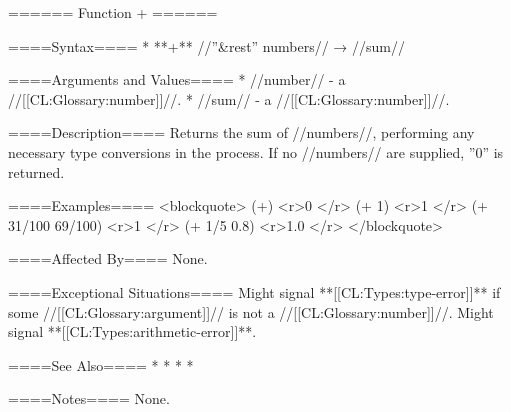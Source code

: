 ====== Function + ======

====Syntax====
  * **+** //''&rest'' numbers// → //sum//

====Arguments and Values====
  * //number// - a //[[CL:Glossary:number]]//.
  * //sum// - a //[[CL:Glossary:number]]//.

====Description====
Returns the sum of //numbers//, performing any necessary type conversions in the process. If no //numbers// are supplied, ''0'' is returned.

====Examples==== 
<blockquote> 
(+) <r>0 </r>
(+ 1) <r>1 </r>
(+ 31/100 69/100) <r>1 </r>
(+ 1/5 0.8) <r>1.0 </r>
</blockquote>

====Affected By====
None.

====Exceptional Situations====
Might signal **[[CL:Types:type-error]]** if some //[[CL:Glossary:argument]]// is not a //[[CL:Glossary:number]]//. Might signal **[[CL:Types:arithmetic-error]]**.

====See Also====
  * {\secref\NumericOperations}
  * {\secref\RationalComputations}
  * {\secref\FloatingPointComputations}
  * {\secref\ComplexComputations}

====Notes====
None.


